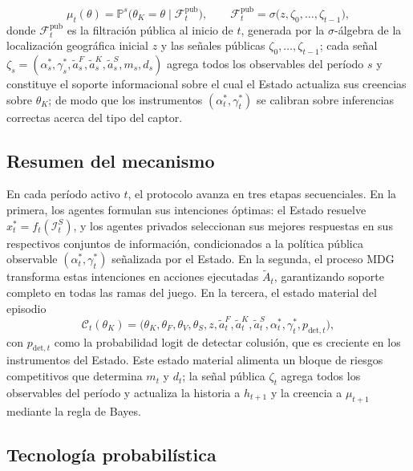 \documentclass[review,authoryear,12pt]{elsarticle}
\theoremstyle{plain}
\theoremstyle{definition}
\newcommand{\Prob}{\mathbb{P}}
\newcommand{\1}{\mathbf{1}}
\begin{document}
\[
\mu_t(\theta)=\Prob^s\!\bigl(\theta_K=\theta\mid\mathcal{F}_t^{\mathrm{pub}}\bigr),\qquad \mathcal{F}_t^{\mathrm{pub}}=\sigma\bigl(z,\zeta_0,\ldots,\zeta_{t-1}\bigr),
\]
donde $\mathcal{F}_t^{\mathrm{pub}}$ es la filtración pública al inicio de $t$, generada por la $\sigma$-álgebra de la localización geográfica inicial $z$ y las señales públicas $\zeta_0,\ldots,\zeta_{t-1}$; cada señal $\zeta_s=(\alpha_s^\ast,\gamma_s^\ast,\tilde{a}_s^F,\tilde{a}_s^K,\tilde{a}_s^S,m_s,d_s)$ agrega todos los observables del período $s$ y constituye el soporte informacional sobre el cual el Estado actualiza sus creencias sobre $\theta_K$; de modo que los instrumentos $(\alpha_t^\ast,\gamma_t^\ast)$ se calibran sobre inferencias correctas acerca del tipo del captor.

\subsection{Resumen del mecanismo}\label{subsec:resumen-mecanismo}

En cada período activo $t$, el protocolo avanza en tres etapas secuenciales. En la primera, los agentes formulan sus intenciones óptimas: el Estado resuelve $x_t^\ast=f_t(\mathcal{I}_t^S)$, y los agentes privados seleccionan sus mejores respuestas en sus respectivos conjuntos de información, condicionados a la política pública observable $(\alpha_t^\ast,\gamma_t^\ast)$ señalizada por el Estado. En la segunda, el proceso MDG transforma estas intenciones en acciones ejecutadas $\tilde{A}_t$, garantizando soporte completo en todas las ramas del juego. En la tercera, el estado material del episodio
\[
\mathcal{C}_t(\theta_K)=\bigl(\theta_K,\theta_F,\theta_V,\theta_S,z,\tilde{a}_t^F,\tilde{a}_t^K,\tilde{a}_t^S,\alpha_t^\ast,\gamma_t^\ast,p_{\mathrm{det},t}\bigr),
\]
con $p_{\mathrm{det},t}$ como la probabilidad logit de detectar colusión, que es creciente en los instrumentos del Estado. Este estado material alimenta un bloque de riesgos competitivos que determina $m_t$ y $d_t$; la señal pública $\zeta_t$ agrega todos los observables del período y actualiza la historia a $h_{t+1}$ y la creencia a $\mu_{t+1}$ mediante la regla de Bayes.

\subsection{Tecnología probabilística}\label{subsec:prob-tech}
\end{document}
